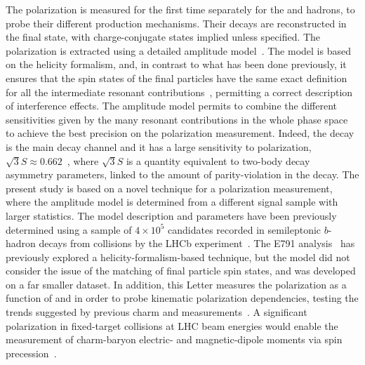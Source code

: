 The polarization is measured for the first time separately for the \Lc and \Lcbar hadrons, to probe their different production mechanisms. Their decays are reconstructed in the \Lcpkpi final state, with charge-conjugate states implied unless specified. The polarization is extracted using a detailed amplitude model~\cite{Marangotto:2020ead}. The model is based on the helicity formalism, and, in contrast to what has been done previously, it ensures that the spin states of the final particles have the same exact definition for all the intermediate resonant contributions~\cite{Marangotto:2019ucc}, permitting a correct description of interference effects. The amplitude model permits to combine the different sensitivities given by the many resonant contributions in the whole \Lcpkpi phase space to achieve the best precision on the polarization measurement. Indeed, the \Lcpkpi decay is the main \Lc decay channel and it has a large sensitivity to polarization, $\sqrt{3}S \approx 0.662$~\cite{LHCb-PAPER-2022-002}, where $\sqrt{3}S$ is a quantity equivalent to two-body decay asymmetry parameters, linked to the amount of parity-violation in the decay.
The present study is based on a novel technique for a polarization measurement, where the amplitude model is determined from a different signal sample with larger statistics. The model description and parameters have been previously determined using a sample of $4\times 10^5$ \Lcpkpi candidates recorded in semileptonic $b$-hadron decays from \proton\proton collisions by the LHCb experiment~\cite{LHCb-PAPER-2022-002}.
The E791 analysis~\cite{Aitala:1999uq} has previously explored a helicity-formalism-based technique, but the model did not consider the issue of the matching of final particle spin states, and was developed on a far smaller dataset.
In addition, this Letter measures the polarization as a function of \pt and \xf in order to probe kinematic polarization dependencies, testing the trends suggested by previous charm and \Lz measurements~\cite{Bunce:1976yb,Heller:1978ty,Lundberg:1989hw,Yuldashev:1990az, RAMBERG1994403,na48, HADES:2014ttv, Abt_2006, LHCb-PAPER-2024-009}.
A significant \Lc polarization in fixed-target collisions at LHC beam energies would enable the measurement of charm-baryon electric- and magnetic-dipole moments via spin precession~\cite{Botella:2016ksl,Bagli:2017foe,Fomin:2017ltw,Marangotto:2713231,Fomin:2019wuw,Mirarchi:2019vqi,Aiola:2020yam,Neri:2024rjv,Akiba:2905467}.



